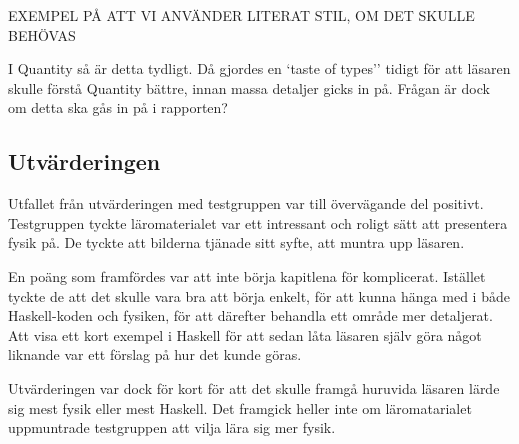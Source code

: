 \begin{binge}

EXEMPEL PÅ ATT VI ANVÄNDER LITERAT STIL, OM DET SKULLE BEHÖVAS

I Quantity så är detta tydligt. Då gjordes en `taste of types'' tidigt för att
läsaren skulle förstå Quantity bättre, innan massa detaljer gicks in på. Frågan
är dock om detta ska gås in på i rapporten?

\end{binge}
\begin{draft}

\section{Utvärderingen}

Utfallet från utvärderingen med testgruppen var till övervägande del positivt. Testgruppen tyckte läromaterialet var ett intressant och roligt sätt att presentera fysik på. De tyckte att bilderna tjänade sitt syfte, att muntra upp läsaren. 

En poäng som framfördes var att inte börja kapitlena för komplicerat. Istället tyckte de att det skulle vara bra att börja enkelt, för att kunna hänga med i både Haskell-koden och fysiken, för att därefter behandla ett område mer detaljerat. Att visa ett kort exempel i Haskell för att sedan låta läsaren själv göra något liknande var ett förslag på hur det kunde göras.

Utvärderingen var dock för kort för att det skulle framgå huruvida läsaren lärde sig mest fysik eller mest Haskell. Det framgick heller inte om läromatarialet uppmuntrade testgruppen att vilja lära sig mer fysik.

\end{draft}






























